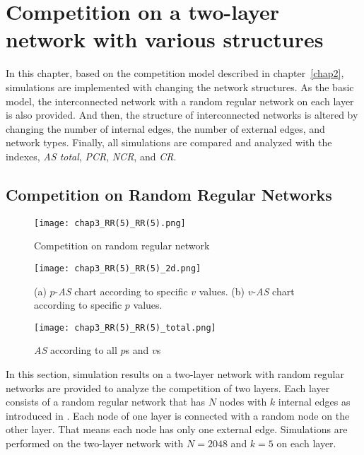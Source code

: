 

\chapter{Competition on a two-layer network with various structures}
\label{chap3}
In this chapter, based on the competition model described in chapter~\ref{chap2}, simulations are implemented with changing the network structures. As the basic model, the interconnected network with a random regular network on each layer is also provided. And then, the structure of interconnected networks is altered by changing the number of internal edges, the number of external edges, and network types. Finally, all simulations are compared and analyzed with the indexes, \textit{AS total}, \textit{PCR}, \textit{NCR}, and \textit{CR}.\\

\section{Competition on Random Regular Networks}
\label{competition on Random Regular Networks}
\begin{figure}[!htb]
	\centering
	\texttt{[image: chap3\_RR(5)\_RR(5).png]}
	\caption{Competition on random regular network}
	\label{chap3_RR(5)_RR(5)}
\end{figure}
\begin{figure}[!htb]
	\centering
	\texttt{[image: chap3\_RR(5)\_RR(5)\_2d.png]}
	\caption{(a) $p$-\textit{AS} chart according to specific $v$ values. (b) $v$-\textit{AS} chart according to specific $p$ values.}
	\label{chap3_RR(5)_RR(5)_2d}
\end{figure}
\begin{figure}[!htb]
	\centering
	\texttt{[image: chap3\_RR(5)\_RR(5)\_total.png]}
	\caption{\textit{AS} according to all $p$s and $v$s}
	\label{chap3_RR(5)_RR(5)_total}
\end{figure}
In this section, simulation results on a two-layer network with random regular networks are provided to analyze the competition of two layers. Each layer consists of a random regular network that has $N$ nodes with $k$ internal edges as introduced in \parencite{kimsangwoo2012, choi2011, bela2001}. Each node of one layer is connected with a random node on the other layer. That means each node has only one external edge. Simulations are performed on the two-layer network with $N=2048$ and $k=5$ on each layer.

